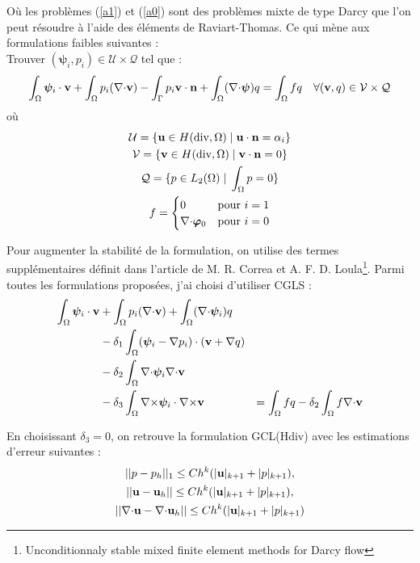 \documentclass[a4paper,11pt]{article}
\begin{document}
Où les problèmes (\ref{a1}) et (\ref{a0}) sont des problèmes mixte de type Darcy que l'on peut résoudre à l'aide des éléments de Raviart-Thomas. Ce qui mène aux formulations faibles suivantes :\\
Trouver $(\bm{\psi}_i,p_i)\in \mathcal{U}\times\mathcal{Q}$ tel que :
\begin{equation}
  \int_\Omega\bm{\psi}_i\cdot{\mathbf{v}} + \int_\Omega p_i({\nabla\cdot}{\mathbf{v}}) - \int_\Gamma p_i{\mathbf{v}}\cdot{\mathbf{n}} + \int_\Omega ({\nabla\cdot}\bm{\psi})q = \int_\Omega fq \quad \forall ({\mathbf{v}},q)\in \mathcal{V}\times\mathcal{Q}
\end{equation}
où
\begin{gather*}
  \mathcal{U} = \{{\mathbf{u}}\in H(\mathrm{div},\Omega) \;|\; {\mathbf{u}}\cdot{\mathbf{n}} = \alpha_i\}\\
  \mathcal{V} = \{{\mathbf{v}}\in H(\mathrm{div},\Omega) \;|\; {\mathbf{v}}\cdot{\mathbf{n}} = 0\}\\
  \mathcal{Q} = \{p\in L_2(\Omega) \;|\; \int_\Omega p = 0 \}\\
  f=\begin{cases}
    0 &\mbox{pour } i=1\\
    {\nabla\cdot}\bm{\varphi}_0 &\mbox{pour } i=0
  \end{cases}
\end{gather*}

Pour augmenter la stabilité de la formulation, on utilise des termes supplémentaires définit dans l'article de M. R. Correa et A. F. D. Loula\footnote{Unconditionnaly stable mixed finite element methods for Darcy flow}. Parmi toutes les formulations proposées, j'ai choisi d'utiliser CGLS :
\begin{equation}
  \begin{aligned}
    \int_\Omega\bm{\psi}_i\cdot{\mathbf{v}} &+ \int_\Omega p_i({\nabla\cdot}{\mathbf{v}}) + \int_\Omega ({\nabla\cdot}\bm{\psi}_i)q&\\
    &-\delta_1 \int_\Omega (\bm{\psi}_i-{\nabla} p_i)\cdot({\mathbf{v}} +{\nabla} q)&\\
    &-\delta_2 \int_\Omega {\nabla\cdot}\bm{\psi}_i{\nabla\cdot}{\mathbf{v}}&\\
    &-\delta_3 \int_\Omega {\nabla\times}\bm{\psi}_i\cdot{\nabla\times}{\mathbf{v}} &= \int_\Omega fq - \delta_2\int_\Omega f{\nabla\cdot}{\mathbf{v}}
  \end{aligned}
\end{equation}

En choisissant $\delta_3=0$, on retrouve la formulation GCL(Hdiv) avec les estimations d'erreur suivantes :
\begin{gather}
  ||p-p_h||_1 \leq Ch^k(|{\mathbf{u}}|_{k+1} + |p|_{k+1}),\\
  ||{\mathbf{u}}-{\mathbf{u}}_h|| \leq Ch^k(|{\mathbf{u}}|_{k+1} + |p|_{k+1}),\\
  ||{\nabla\cdot}{\mathbf{u}}-{\nabla\cdot}{\mathbf{u}}_h|| \leq Ch^k(|{\mathbf{u}}|_{k+1} + |p|_{k+1})
\end{gather}
\end{document}
